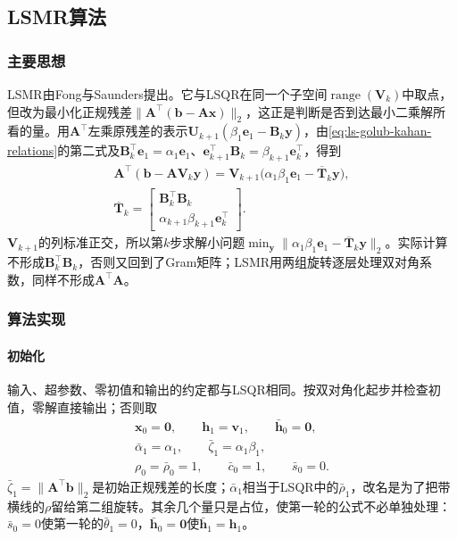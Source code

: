 \subsection{LSMR算法}
\label{sec:ls-lsmr}

\subsubsection{主要思想}

LSMR由Fong与Saunders提出。它与LSQR在同一个子空间$\operatorname{range}(\bm V_k)$中取点，但改为最小化正规残差$\lVert\bm A^\top(\bm b-\bm A\bm x)\rVert_2$，这正是判断是否到达最小二乘解所看的量。用$\bm A^\top$左乘原残差的表示$\bm U_{k+1}(\beta_1\bm e_1-\bm B_k\bm y)$，由\eqref{eq:ls-golub-kahan-relations}的第二式及$\bm B_k^\top\bm e_1=\alpha_1\bm e_1$、$\bm e_{k+1}^\top\bm B_k=\beta_{k+1}\bm e_k^\top$，得到
\begin{equation}
 \begin{gathered}
 \bm A^\top(\bm b-\bm A\bm V_k\bm y)
 =\bm V_{k+1}\bigl(\alpha_1\beta_1\bm e_1-\overline{\bm T}_k\bm y\bigr),\\
 \overline{\bm T}_k=\begin{bmatrix}\bm B_k^\top\bm B_k\\ \alpha_{k+1}\beta_{k+1}\bm e_k^\top\end{bmatrix}.
 \end{gathered}
 \label{eq:ls-lsmr-subproblem}
\end{equation}
$\bm V_{k+1}$的列标准正交，所以第$k$步求解小问题$\min_{\bm y}\lVert\alpha_1\beta_1\bm e_1-\overline{\bm T}_k\bm y\rVert_2$。实际计算不形成$\bm B_k^\top\bm B_k$，否则又回到了Gram矩阵；LSMR用两组旋转逐层处理双对角系数，同样不形成$\bm A^\top\bm A$。

\subsubsection{算法实现}

\paragraph{初始化}
输入、超参数、零初值和输出的约定都与LSQR相同。按双对角化起步并检查初值，零解直接输出；否则取
\[
 \begin{gathered}
 \bm x_0=\bm0,\qquad \bm h_1=\bm v_1,\qquad \bar{\bm h}_0=\bm0,\\
 \bar\alpha_1=\alpha_1,\qquad \bar\zeta_1=\alpha_1\beta_1,\\
 \rho_0=\bar\rho_0=1,\qquad \bar c_0=1,\qquad \bar s_0=0 .
 \end{gathered}
\]
$\bar\zeta_1=\lVert\bm A^\top\bm b\rVert_2$是初始正规残差的长度；$\bar\alpha_1$相当于LSQR中的$\bar\rho_1$，改名是为了把带横线的$\rho$留给第二组旋转。其余几个量只是占位，使第一轮的公式不必单独处理：$\bar s_0=0$使第一轮的$\bar\theta_1=0$，$\bar{\bm h}_0=\bm0$使$\bar{\bm h}_1=\bm h_1$。

